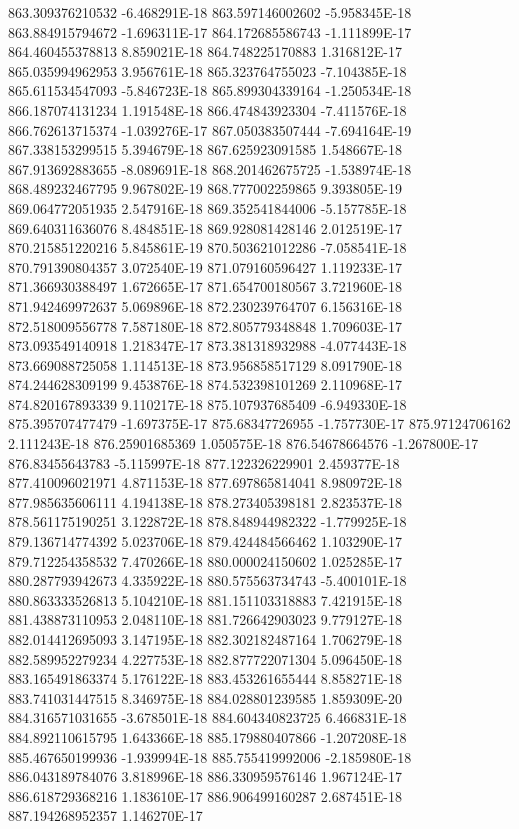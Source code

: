 863.309376210532  -6.468291E-18
863.597146002602  -5.958345E-18
863.884915794672  -1.696311E-17
864.172685586743  -1.111899E-17
864.460455378813  8.859021E-18
864.748225170883  1.316812E-17
865.035994962953  3.956761E-18
865.323764755023  -7.104385E-18
865.611534547093  -5.846723E-18
865.899304339164  -1.250534E-18
866.187074131234  1.191548E-18
866.474843923304  -7.411576E-18
866.762613715374  -1.039276E-17
867.050383507444  -7.694164E-19
867.338153299515  5.394679E-18
867.625923091585  1.548667E-18
867.913692883655  -8.089691E-18
868.201462675725  -1.538974E-18
868.489232467795  9.967802E-19
868.777002259865  9.393805E-19
869.064772051935  2.547916E-18
869.352541844006  -5.157785E-18
869.640311636076  8.484851E-18
869.928081428146  2.012519E-17
870.215851220216  5.845861E-19
870.503621012286  -7.058541E-18
870.791390804357  3.072540E-19
871.079160596427  1.119233E-17
871.366930388497  1.672665E-17
871.654700180567  3.721960E-18
871.942469972637  5.069896E-18
872.230239764707  6.156316E-18
872.518009556778  7.587180E-18
872.805779348848  1.709603E-17
873.093549140918  1.218347E-17
873.381318932988  -4.077443E-18
873.669088725058  1.114513E-18
873.956858517129  8.091790E-18
874.244628309199  9.453876E-18
874.532398101269  2.110968E-17
874.820167893339  9.110217E-18
875.107937685409  -6.949330E-18
875.395707477479  -1.697375E-17
875.68347726955  -1.757730E-17
875.97124706162  2.111243E-18
876.25901685369  1.050575E-18
876.54678664576  -1.267800E-17
876.83455643783  -5.115997E-18
877.122326229901  2.459377E-18
877.410096021971  4.871153E-18
877.697865814041  8.980972E-18
877.985635606111  4.194138E-18
878.273405398181  2.823537E-18
878.561175190251  3.122872E-18
878.848944982322  -1.779925E-18
879.136714774392  5.023706E-18
879.424484566462  1.103290E-17
879.712254358532  7.470266E-18
880.000024150602  1.025285E-17
880.287793942673  4.335922E-18
880.575563734743  -5.400101E-18
880.863333526813  5.104210E-18
881.151103318883  7.421915E-18
881.438873110953  2.048110E-18
881.726642903023  9.779127E-18
882.014412695093  3.147195E-18
882.302182487164  1.706279E-18
882.589952279234  4.227753E-18
882.877722071304  5.096450E-18
883.165491863374  5.176122E-18
883.453261655444  8.858271E-18
883.741031447515  8.346975E-18
884.028801239585  1.859309E-20
884.316571031655  -3.678501E-18
884.604340823725  6.466831E-18
884.892110615795  1.643366E-18
885.179880407866  -1.207208E-18
885.467650199936  -1.939994E-18
885.755419992006  -2.185980E-18
886.043189784076  3.818996E-18
886.330959576146  1.967124E-17
886.618729368216  1.183610E-17
886.906499160287  2.687451E-18
887.194268952357  1.146270E-17
